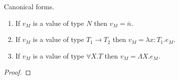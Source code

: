 \begin{scf}
\label{scf}
Canonical forms.
\begin{enumerate}
\item If $v_{M}$ is a value of type $N$ then $v_{M}=\overline{n}$.
\item If $v_{M}$ is a value of type $T_{1}\rightarrow T_{2}$ then $v_{M}=\lambda x:T_{1}.e_{M}$.
\item If $v_{M}$ is a value of type $\forall X.T$ then $v_{M}=\Lambda X.e_{M}$.
\end{enumerate}
\begin{proof}

\end{proof}
\end{scf}